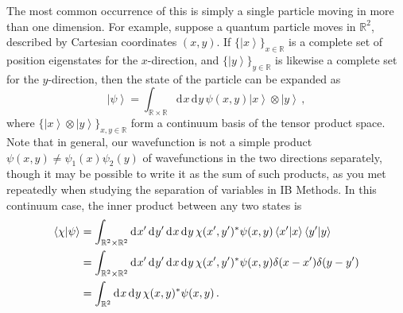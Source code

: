 \documentclass{article}
\theoremstyle{plain}\theoremheaderfont{\normalfont\itshape}\theorembodyfont{\rmfamily}\theoremseparator{.}\newtheorem*{rem}{Remark}\newtheorem*{ex}{Example}\newtheorem*{proof}{Proof}\newtheorem*{altp}{Alternative proof}
\theoremstyle{plain}\theoremheaderfont{\normalfont\bfseries}\theorembodyfont{\rmfamily}\theoremseparator{.}\newtheorem{thm}{Theorem}[section]\newtheorem{lem}[thm]{Lemma}\newtheorem{prop}[thm]{Proposition}\newtheorem*{cor}{Corollary}\newtheorem{defn}[thm]{Definition}\newtheorem{clm}[thm]{Claim}\newtheorem{clminproof}{Claim}
\theoremstyle{break}\theoremheaderfont{\normalfont\itshape}\theorembodyfont{\rmfamily}\theoremseparator{.\medskip}\newtheorem*{proofskip}{Proof}\newtheorem*{exs}{Examples}\newtheorem*{rems}{Remarks}
\theoremstyle{break}\theoremheaderfont{\normalfont\bfseries}\theorembodyfont{\rmfamily}\theoremseparator{.\medskip}\newtheorem{lemskip}[thm]{Lemma}\newtheorem{defnskip}[thm]{Definition}\newtheorem{propskip}[thm]{Proposition}\newtheorem{thmskip}[thm]{Theorem}
\numberwithin{equation}{section}
\newcommand{\dd}[2][]{\mathrm{d}^{#1} #2\,}
\newcommand{\ket}[1]{\left| #1 \right\rangle}
\newcommand{\braket}[2]{\left\langle #1 \middle| #2 \right\rangle}
\newcommand{\RR}{\mathbb{R}}
\begin{document}
    The most common occurrence of this is simply a single particle moving in more than one dimension. For example, suppose a quantum particle moves in \(\RR^2\), described by Cartesian coordinates \((x,y)\). If \(\{\ket{x}\}_{x\in\RR}\) is a complete set of position eigenstates for the \(x\)-direction, and \(\{\ket{y}\}_{y\in\RR}\) is likewise a complete set for the \(y\)-direction, then the state of the particle can be expanded as
    \begin{equation}
        \ket{\psi}=\int_{\RR\times\RR}\dd{x}\dd{y}\psi(x,y)\ket{x}\otimes\ket{y}\,,
    \end{equation}
    where \(\{\ket{x}\otimes\ket{y}\}_{x,y\in\RR}\) form a continuum basis of the tensor product space. Note that in general, our wavefunction is not a simple product \(\psi(x,y)\ne\psi_1(x)\psi_2(y)\) of wavefunctions in the two directions separately, though it may be possible to write it as the sum of such products, as you met repeatedly when studying the separation of variables in IB Methods. In this continuum case, the inner product between any two states is
    \begin{align}
        \braket{\chi}{\psi}&=\int_{\RR^2\times\RR^2}\dd{x'}\dd{y'}\dd{x}\dd{y}\chi(x',y')^*\psi(x,y)\braket{x'}{x}\braket{y'}{y}\notag\\
        &=\int_{\RR^2\times\RR^2}\dd{x'}\dd{y'}\dd{x}\dd{y}\chi(x',y')^*\psi(x,y)\delta(x-x')\delta(y-y')\notag\\
        &=\int_{\RR^2}\dd{x}\dd{y}\chi(x,y)^*\psi(x,y)\,.
    \end{align}
\end{document}
